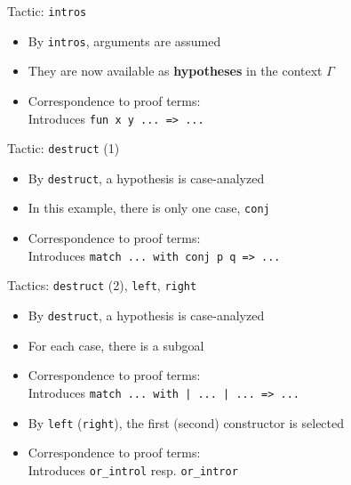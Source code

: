 \begin{frame}[fragile]{Tactic: \lstinline|intros|}

\begin{itemize}
  \item By \lstinline|intros|, arguments are assumed
  \pause
  \item They are now available as \textbf{hypotheses} in the context $Γ$
  \pause
  \item Correspondence to proof terms:\\
  Introduces \lstinline|fun x y ... => ...|
\end{itemize}
\end{frame}

\begin{frame}[fragile]{Tactic: \lstinline|destruct| (1)}

\begin{itemize}
  \item By \lstinline|destruct|, a hypothesis is case-analyzed
  \pause
  \item In this example, there is only one case, \lstinline|conj|
  \pause
  \item Correspondence to proof terms:\\
  Introduces \lstinline|match ... with conj p q => ...|
\end{itemize}
\end{frame}

\begin{frame}[fragile]{Tactics: \lstinline|destruct| (2), \lstinline|left|, \lstinline|right|}

\begin{itemize}
  \item By \lstinline|destruct|, a hypothesis is case-analyzed
  \pause
  \item For each case, there is a subgoal
  \pause
  \item Correspondence to proof terms:\\
  Introduces \lstinline&match ... with | ... | ... => ...&
  \item By \lstinline|left| (\lstinline|right|), the first (second) constructor is selected
  \item Correspondence to proof terms:\\
  Introduces \lstinline|or_introl| resp. \lstinline|or_intror|
\end{itemize}
\end{frame}

